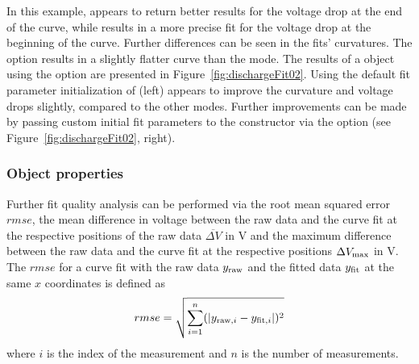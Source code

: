In this example,  appears to return better results for the voltage drop at the end of the curve, while  results in a more precise fit for the voltage drop at the beginning of the curve. Further differences can be seen in the fits' curvatures. 
The  option results in a slightly flatter curve than the  mode. The results of a  object using the  option are presented in Figure~\ref{fig:dischargeFit02}.
Using the default fit parameter initialization of  (left) appears to improve the curvature and voltage drops slightly, compared to the other modes. Further improvements can be made by passing custom initial fit parameters to the constructor via the option  (see Figure~\ref{fig:dischargeFit02}, right).

\subsubsection{Object properties}
Further fit quality analysis can be performed via the root mean squared error $rmse$, the mean difference in voltage between the raw data and the curve fit at the respective positions of the raw data $\overline{\Delta V}$ in V and the maximum difference between the raw data and the curve fit at the respective positions $\Delta V_\text{max}$ in V.
The $rmse$ for a curve fit with the raw data $y_\text{raw}$ and the fitted data $y_\text{fit}$ at the same $x$ coordinates is defined as
\begin{equation}
rmse = \sqrt{\sum_{i = 1}^{n}(|y_{\text{raw}, i}-y_{\text{fit}, i}|)^2}
\end{equation}
where $i$ is the index of the measurement and $n$ is the number of measurements.
